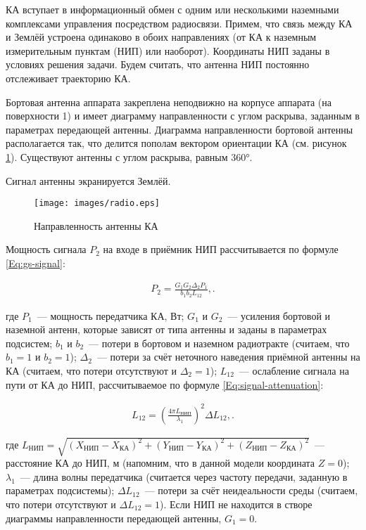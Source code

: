 \documentclass[12pt,a4paper]{article}
\begin{document}
КА вступает в информационный обмен с одним или несколькими наземными комплексами
управления посредством радиосвязи. Примем, что связь между КА и Землёй устроена одинаково
в обоих направлениях (от КА к наземным измерительным пунктам (НИП) или
наоборот). Координаты НИП заданы в условиях решения задачи. Будем считать, что антенна НИП
постоянно отслеживает траекторию КА.

Бортовая антенна аппарата закреплена неподвижно на корпусе аппарата (на поверхности 1) и
имеет диаграмму направленности с углом раскрыва, заданным в параметрах передающей
антенны. Диаграмма направленности бортовой антенны располагается так, что делится пополам
вектором ориентации КА (см. рисунок \ref{Pic:Radio}). Существуют антенны с углом раскрыва, равным 360°.

Сигнал антенны экранируется Землёй.

\begin{figure}[tbh]
  \begin{center}
    \texttt{[image: images/radio.eps]}
    \caption{Направленность антенны КА}
    \label{Pic:Radio}
  \end{center}
\end{figure}

Мощность сигнала $P_2$ на входе в приёмник НИП рассчитывается по формуле
\ref{Eq:gs-signal}:

\begin{eqnarray}
P_2 = \frac{G_1 G_2 \Delta_2 P_1}{b_1 b_2 L_{12}}, \label{Eq:gs-signal}.
\end{eqnarray}

где $P_1$~--– мощность передатчика КА, Вт; $G_1$ и $G_2$~--– усиления бортовой и наземной
антенн, которые зависят от типа антенны и заданы в параметрах подсистем; $b_1$ и $b_2$~--–
потери в бортовом и наземном радиотракте (считаем, что $b_1 = 1$ и $b_2 = 1$);
$\Delta_2$~--– потери за счёт неточного наведения приёмной антенны на КА (считаем, что
потери отсутствуют и $\Delta_2 = 1$); $L_{12}$~--– ослабление сигнала на пути от КА до
НИП, рассчитываемое по формуле \ref{Eq:signal-attenuation}:

\begin{eqnarray}
L_{12} = \left( \frac{4 \pi L_{\text{НИП}}}{\lambda_1} \right)^2 \Delta L_{12}, \label{Eq:signal-attenuation}.
\end{eqnarray}

где $L_{\text{НИП}} = \sqrt{(X_{\text{НИП}} - X_{\text{КА}})^2 + (Y_{\text{НИП}} -
  Y_{\text{КА}})^2 + (Z_{\text{НИП}} - Z_{\text{КА}})^2}$~--- расстояние КА до НИП, м
(напомним, что в данной модели координата $Z = 0$); $\lambda_1$~--- длина волны передатчика
(считается через частоту передачи, заданную в параметрах подсистемы); $\Delta L_{12}$~---
потери за счёт неидеальности среды (считаем, что потери отсутствуют и $\Delta L_{12} = 1$). Если НИП
не находится в створе диаграммы направленности передающей антенны, $G_1 = 0$.
\end{document}
